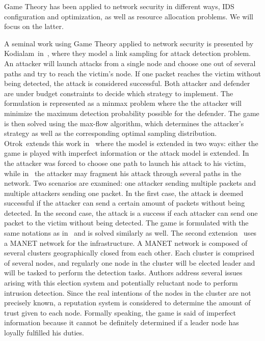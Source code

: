 Game Theory has been applied to network security in different ways, IDS configuration and optimization, as well as resource allocation problems. We will focus on the latter.

 A seminal work using Game Theory applied to network security is presented by Kodialam~\etal in~\cite{MuraliKodialam2003}, where they model a link sampling for attack detection problem.
 An attacker will launch attacks from a single node and choose one out of several paths and try to reach the victim's node.
 If one packet reaches the victim without being detected, the attack is considered successful.
 Both attacker and defender are under budget constraints to decide which strategy to implement.
 The formulation is represented as a minmax problem where the the attacker will minimize the maximum detection probability possible for the defender.
 The game is then solved using the max-flow algorithm, which determines the attacker's strategy as well as the corresponding optimal sampling distribution.
 Otrok~\etal extends this work in~\cite{otrok1,otrok2} where the model is extended in two ways: either the game is played with imperfect information or the attack model is extended.
 In~\cite{MuraliKodialam2003} the attacker was forced to choose one path to launch his attack to his victim, while in~\cite{otrok1} the attacker may fragment his attack through several paths in the network.
 Two scenarios are examined: one attacker sending multiple packets and multiple attackers sending one packet.
 In the first case, the attack is deemed successful if the attacker can send a certain amount of packets without being detected.
 In the second case, the attack is a success if each attacker can send one packet to the victim without being detected.
 The game is formulated with the same notations as in~\cite{MuraliKodialam2003} and is solved similarly as well.
 The second extension~\cite{otrok2} uses a MANET network for the infrastructure.
 A MANET network is composed of several clusters geographically closed from each other.
 Each cluster is comprised of several nodes, and regularly one node in the cluster will be elected leader and will be tasked to perform the detection tasks. Authors address several issues arising with this election system and potentially reluctant node to perform intrusion detection.
 Since the real intentions of the nodes in the cluster are not precisely known, a reputation system is considered to determine the amount of trust given to each node.
 Formally speaking, the game is said of imperfect information because it cannot be definitely determined if a leader node has loyally fulfilled his duties.
 
